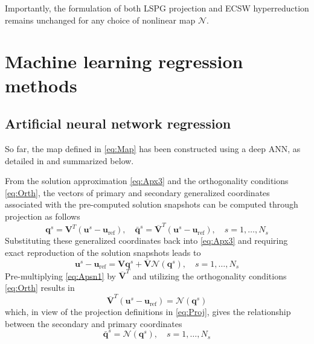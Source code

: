 \documentclass[preprint,10pt]{elsarticle}
\begin{document}
Importantly, the formulation of both LSPG projection and ECSW hyperreduction remains unchanged for any choice of nonlinear map $\mathcal{N}$. 

\color{black}

\section{Machine learning regression methods}
\label{sec:Mlr}

\subsection{Artificial neural network regression}
\label{sec:Ann}

So far, the map defined in \eqref{eq:Map} has been constructed using a deep ANN, as detailed in \cite{barnett2023neural, chmiel2025unified} and summarized below.

From the solution approximation \eqref{eq:Apx3} and the orthogonality conditions \eqref{eq:Orth}, the vectors of primary and secondary generalized coordinates associated with the 
pre-computed solution snapshots can be computed through projection
as follows
\begin{equation}
\label{eq:Proj}
\mathbf{q}^s = \mathbf{V}^T\left(\mathbf{u}^s - \mathbf{u}_\text{ref}\right), \quad \bar{\mathbf{q}}^s = \overline{\mathbf{V}}^T\left(\mathbf{u}^s - \mathbf{u}_\text{ref}\right), \quad s = 1, \dots, N_s
\end{equation}
Substituting these generalized coordinates back into \eqref{eq:Apx3} and requiring exact reproduction of the solution snapshots leads to
\begin{equation}
\label{eq:Apsn1}
\mathbf{u}^s - \mathbf{u}_\text{ref} = \mathbf{V} \mathbf{q}^s + \overline{\mathbf{V}}\mathcal{N}\left(\mathbf{q}^s\right), \quad  s = 1, \dots, N_s
\end{equation}
Pre-multiplying \eqref{eq:Apsn1} by $\overline{\mathbf{V}}^T$ and utilizing the orthogonality conditions \eqref{eq:Orth} results in
\begin{equation*}
\overline{\mathbf V}^T\left(\mathbf{u}^s - \mathbf{u}_\text{ref}\right)= \mathcal{N}\left(\mathbf{q}^s\right)
\end{equation*}
which, in view of the projection definitions in \eqref{eq:Proj}, gives the relationship between the secondary and primary coordinates
\begin{equation*}
\bar{\mathbf{q}}^s = \mathcal{N}\left(\mathbf{q}^s\right), \quad s = 1, \dots, N_s
\end{equation*}
\end{document}
